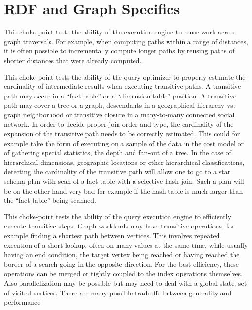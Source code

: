 


\section{RDF and Graph Specifics}


This choke-point tests the ability of the execution engine to reuse work across
graph traversals. For example, when computing paths within a range of distances,
it is often possible to incrementally compute longer paths by reusing paths of
shorter distances that were already computed.




This choke-point tests the ability of the query optimizer to properly estimate the cardinality of intermediate results when executing transitive paths. A transitive path may occur in a ``fact table'' or a ``dimension table'' position.
A transitive path may cover a tree or a graph, \eg descendants in a geographical hierarchy vs. graph neighborhood or transitive closure in a many-to-many connected social network.
In order to decide proper join order and type, the cardinality of the expansion of the transitive path needs to be correctly estimated.
This could for example take the form of executing on a sample of the data in the cost model or of gathering special statistics, \eg the depth and fan-out of a tree. In the case of hierarchical dimensions,
\eg geographic locations or other hierarchical classifications, detecting the cardinality of the transitive path will allow one to go to a star schema plan with scan of a fact table with a selective hash join.
Such a plan will be on the other hand very bad for example if the hash table is much larger than the ``fact table'' being scanned.




This choke-point tests the ability of the query execution engine to efficiently execute transitive steps. Graph workloads may have transitive operations, for example finding a shortest path between vertices.
This involves repeated execution of a short lookup, often on many values at the same time, while usually having an end condition, \eg the target vertex being reached or having reached the border of a search going in the opposite direction.
For the best efficiency, these operations can be merged or tightly coupled to the index operations themselves. Also parallelization may be possible but may need to deal with a global state, \eg set of visited vertices.
There are many possible tradeoffs between generality and performance

